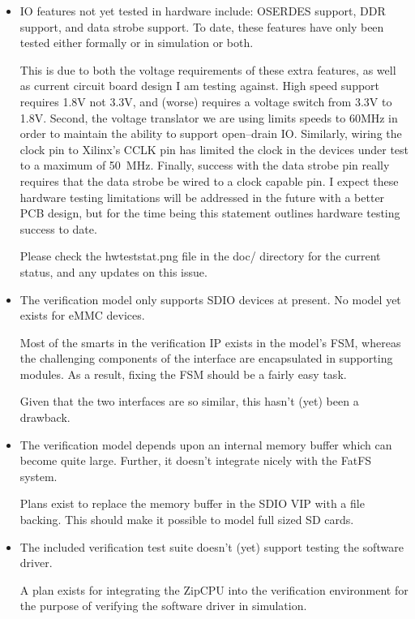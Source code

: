 \documentclass{gqtekspec}
\begin{document}
\begin{itemize}
\item IO features not yet tested in hardware include: OSERDES support, DDR
	support, and data strobe support.  To date, these features have only
	been tested either formally or in simulation or both.

	This is due to both the voltage requirements of these extra features,
	as well as current circuit board design I am testing against.  High
	speed support requires 1.8V not 3.3V, and (worse) requires a voltage
	switch from 3.3V to 1.8V.  Second, the voltage translator we are
	using limits speeds to 60MHz in order to maintain the ability to
	support open--drain IO.  Similarly, wiring the clock pin to Xilinx's
	CCLK pin has limited the clock in the devices under test to a maximum
	of 50~MHz.  Finally, success with the data strobe pin really requires
	that the data strobe be wired to a clock capable pin.  I expect these
	hardware testing limitations will be addressed in the future with a
	better PCB design, but for the time being this statement outlines
	hardware testing success to date.

	Please check the hwteststat.png file in the doc/ directory for the
	current status, and any updates on this issue.

\item The verification model only supports SDIO devices at present.  No model
	yet exists for eMMC devices.

	Most of the smarts in the verification IP exists in the model's FSM,
	whereas the challenging components of the interface are encapsulated
	in supporting modules.  As a result, fixing the FSM should be a fairly
	easy task.

	Given that the two interfaces are so similar, this hasn't (yet) been
	a drawback.

\item The verification model depends upon an internal memory buffer which can
	become quite large.  Further, it doesn't integrate nicely with the
	FatFS system.

	Plans exist to replace the memory buffer in the SDIO VIP with a file
	backing.  This should make it possible to model full sized SD cards.

\item The included verification test suite doesn't (yet) support testing the
	software driver.

	A plan exists for integrating the ZipCPU into the verification
	environment for the purpose of verifying the software driver in
	simulation.


\end{itemize}
\end{document}
